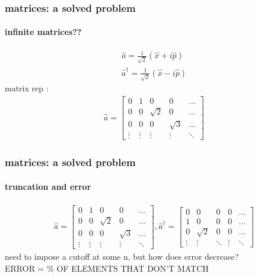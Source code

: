 \documentclass{beamer}
\begin{document}
\begin{frame}
\frametitle{matrices: a solved problem}
\framesubtitle{infinite matrices??}
\begin{align}
\hat{a} = \frac{1}{\sqrt{2}} (\hat{x} + i\hat{p})\\
\hat{a}^\dagger = \frac{1}{\sqrt{2}} (\hat{x} - i\hat{p})
\end{align}
matrix rep :
\begin{align}
\hat{a}=\begin{bmatrix}
0 & 1 & 0 & 0 &\hdots \\
0 & 0 & \sqrt{2} & 0 & \hdots\\
0 & 0 & 0 & \sqrt{3}& \hdots \\
\vdots & \vdots & \vdots & \vdots & \ddots
\end{bmatrix}
\end{align}
\end{frame}
\begin{frame}
\frametitle{matrices: a solved problem}
\framesubtitle{truncation and error}
\begin{align*}
\hat{a}=\begin{bmatrix}
0 & 1 & 0 & 0 &\hdots \\
0 & 0 & \sqrt{2} & 0 & \hdots\\
0 & 0 & 0 & \sqrt{3}& \hdots \\
\vdots & \vdots & \vdots & \vdots & \ddots
\end{bmatrix}, \hat{a}^\dagger = \begin{bmatrix}
0 & 0 & 0 & 0 &\hdots \\
1 & 0 & 0& 0 & \hdots\\
0 & \sqrt{2} & 0 & 0& \hdots \\
\vdots & \vdots & \ddots & \vdots & \ddots
\end{bmatrix}
\end{align*}
need to impose a cutoff at some n, but how does error decrease?\\
ERROR = \% OF ELEMENTS THAT DON'T MATCH 
\end{frame}
\end{document}
